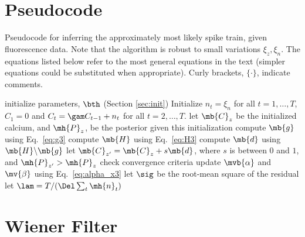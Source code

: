 \appendix


\newpage
\section{Pseudocode} \label{sec:pseudo}

\begin{algorithm}[h!]
\caption{Pseudocode for inferring the approximately most likely spike train, given fluorescence data. Note that the algorithm is robust to small variations $\xi_z, \xi_n$. The equations listed below refer to the most general equations in the text (simpler equations could be substituted when appropriate).  Curly brackets, $\{ \cdot \}$, indicate comments.}
\label{eqn:pseudocode}
\begin{algorithmic}[1]
\STATE initialize parameters, $\bth$ (Section \ref{sec:init})	
    \STATE Initialize $n_t=\xi_n$ for all $t=1,\ldots, T$, $C_1=0$ and $C_t = \gam C_{t-1} + n_t$ for all $t=2,\ldots, T$.
	\STATE let $\mb{C}_{z}$ be the initialized calcium, and $\mh{P}_{z}$, be the posterior given this initialization
		\STATE compute $\mb{g}$ using Eq.~\eqref{eq:g3}
		\STATE compute $\mb{H}$ using Eq.~\eqref{eq:H3}
		\STATE compute $\mb{d}$ using $\mb{H} \backslash \mb{g}$ 
		\STATE let $\mb{C}_{z'}=\mb{C}_z + s \mb{d}$, where $s$ is between $0$ and $1$, and $\mh{P}_{z'}>\mh{P}_z$ 
	\ENDWHILE
  \ENDFOR
\STATE check convergence criteria
\STATE update $\mvb{\alpha}$ and $\mv{\beta}$ using Eq.~\eqref{eq:alpha_x3}   
\STATE let $\sig$ be the root-mean square of the residual
\STATE let $\lam=T/(\Del\sum_t \mh{n}_t)$
\ENDWHILE
\end{algorithmic}
\end{algorithm}

\clearpage
\section{Wiener Filter} \label{sec:wiener}

